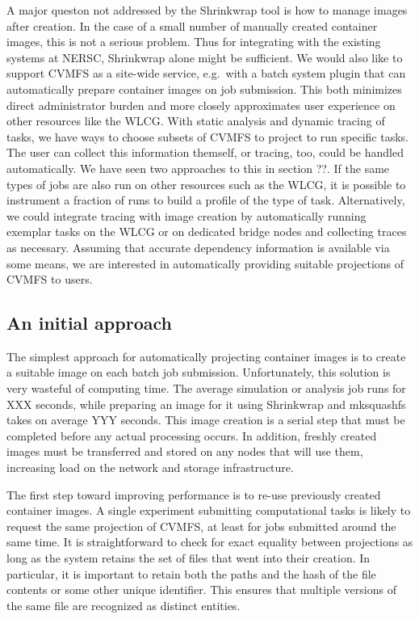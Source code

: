 \documentclass[conference]{IEEEtran}
\begin{document}
A major queston not addressed by the Shrinkwrap tool is how to manage images after creation.
In the case of a small number of manually created container images,
this is not a serious problem.
Thus for integrating with the existing systems at NERSC,
Shrinkwrap alone might be sufficient.
We would also like to support CVMFS as a site-wide service,
e.g.\ with a batch system plugin that can automatically prepare container images on job submission.
This both minimizes direct administrator burden and more closely approximates user experience on other resources like the WLCG.
With static analysis and dynamic tracing of tasks,
we have ways to choose subsets of CVMFS to project to run specific tasks.
The user can collect this information themself,
or tracing, too, could be handled automatically.
We have seen two approaches to this in section ??.
If the same types of jobs are also run on other resources such as the WLCG,
it is possible to instrument a fraction of runs to build a profile of the type of task.
Alternatively, we could integrate tracing with image creation by automatically running exemplar tasks on the WLCG or on dedicated bridge nodes and collecting traces as necessary.
Assuming that accurate dependency information is available via some means,
we are interested in automatically providing suitable projections of CVMFS to users.

\subsection{An initial approach}

The simplest approach for automatically projecting container images is to create a suitable image on each batch job submission.
Unfortunately, this solution is very wasteful of computing time.
The average simulation or analysis job runs for XXX seconds,
while preparing an image for it using Shrinkwrap and mksquashfs takes on average YYY seconds.
This image creation is a serial step that must be completed before any actual processing occurs.
In addition, freshly created images must be transferred and stored on any nodes that will use them,
increasing load on the network and storage infrastructure.

The first step toward improving performance is to re-use previously created container images.
A single experiment submitting computational tasks is likely to request the same projection of CVMFS,
at least for jobs submitted around the same time.
It is straightforward to check for exact equality between projections as long as the system retains the set of files that went into their creation.
In particular, it is important to retain both the paths and the hash of the file contents or some other unique identifier.
This ensures that multiple versions of the same file are recognized as distinct entities.
\end{document}
